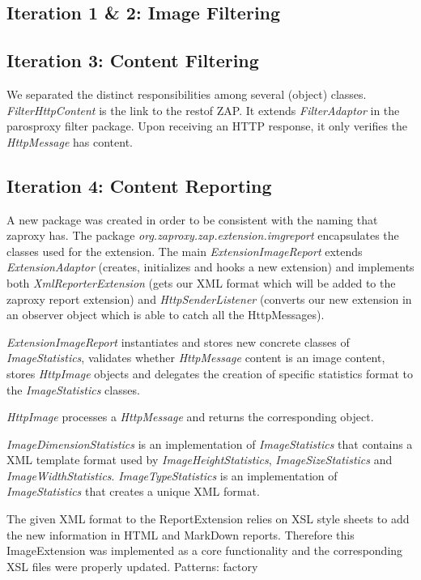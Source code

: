 \subsection{Iteration 1 \& 2: Image Filtering}
\subsection{Iteration 3: Content Filtering}
We separated the distinct responsibilities among several (object) classes. \textit{FilterHttpContent} is the link to the restof ZAP. It extends \textit{FilterAdaptor} in the parosproxy filter package. Upon receiving an HTTP response, it only verifies the \textit{HttpMessage} has content.
\subsection{Iteration 4: Content Reporting}
A new package was created in order to be consistent with the naming that zaproxy has. The package \textit{org.zaproxy.zap.extension.imgreport} encapsulates the classes used for the extension. The main \textit{ExtensionImageReport} extends \textit{ExtensionAdaptor} (creates, initializes and hooks a new extension) and implements both \textit{XmlReporterExtension} (gets our XML format which will be added to the zaproxy report extension) and \textit{HttpSenderListener} (converts our new extension in an observer object which is able to catch all the HttpMessages).
\par
\textit{ExtensionImageReport} instantiates and stores new concrete classes of \textit{ImageStatistics}, validates whether \textit{HttpMessage} content is an image content, stores \textit{HttpImage} objects and delegates the creation of specific statistics format to the \textit{ImageStatistics} classes. 
\par
\textit{HttpImage} processes a \textit{HttpMessage} and returns the corresponding object.
\par
\textit{ImageDimensionStatistics} is an implementation of \textit{ImageStatistics} that contains a XML template format used by \textit{ImageHeightStatistics}, \textit{ImageSizeStatistics} and \textit{ImageWidthStatistics}. \textit{ImageTypeStatistics} is an implementation of \textit{ImageStatistics} that creates a unique XML format.
\par
The given XML format to the ReportExtension relies on XSL style sheets to add the new information in HTML and MarkDown reports. Therefore this ImageExtension was implemented as a core functionality and the corresponding XSL files were properly updated.
Patterns: factory
